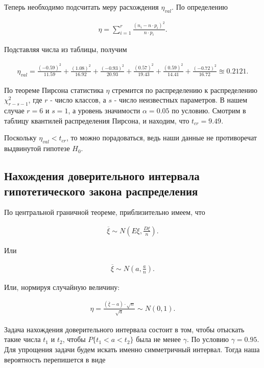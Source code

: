 \documentclass[14pt,a4paper]{scrartcl}
\theoremstyle{definition}
\theoremstyle{remark}
\theoremstyle{definition}
\theoremstyle{definition}
\begin{document}
Теперь необходимо подсчитать меру расхождения $\eta_{val}$. По определению

\begin{align*}
  \eta = \sum_{i=1}^{r} \frac{(n_{i} - n\cdot p_{i})^2}{n\cdot p_{i}}.
\end{align*}

Подставляя числа из таблицы, получим

\begin{align*}
  \eta_{val} = \frac{(-0.59)^2}{11.59} + \frac{(1.08)^2}{16.92} + \frac{(-0.93)^2}{20.93} + \frac{(0.57)^2}{19.43} + \frac{(0.59)^2}{14.41} + \frac{(-0.72)^2}{16.72} \approxeq 0.2121.
\end{align*}

По теореме Пирсона статистика $\eta$ стремится по распределению к распределению $\chi_{r-s-1}^2$, где $r$ - число классов, а $s$ - число неизвестных параметров. В нашем случае $r = 6$ и $s = 1$, а уровень значимости $\alpha = 0.05$ по условию. Смотрим в таблицу квантилей распределения Пирсона, и находим, что $t_{cr} = 9.49.$

Поскольку $\eta_{val} < t_{cr}$, то можно порадоваться, ведь наши данные не противоречат выдвинутой гипотезе $H_{0}$.

\subsection{Нахождения доверительного интервала гипотетического закона распределения}

По центральной граничной теореме, приблизительно имеем, что

\begin{align*}
  \overline{\xi} \sim N(E\xi, \frac{D\xi}{n}).
\end{align*}

Или

\begin{align*}
  \overline{\xi} \sim N(a, \frac{a}{n}).
\end{align*}

Или, нормируя случайную величину:

\begin{align*}
  \eta = \frac{(\overline{\xi}-a)\cdot \sqrt{n}}{\sqrt{a}} \sim N(0, 1).
\end{align*}

Задача нахождения доверительного интервала состоит в том, чтобы отыскать такие числа $t_{1}$ и $t_{2}$, чтобы $P\{t_{1} < a < t_{2}\}$ была не менее $\gamma$. По условию $\gamma = 0.95$. Для упрощения задачи будем искать именно симметричный интервал. Тогда наша вероятность перепишется в виде
\end{document}

